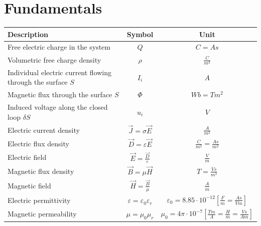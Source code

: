\section{Fundamentals}

\begin{tabular}{|l|c|c|}
\hline \textbf{Description} & \textbf{Symbol} & \textbf{Unit} \\ 
\hline Free electric charge in the system & $Q$ & $C = As$ \\
\hline Volumetric free charge density & $\rho$ & $\frac{C}{m^3}$ \\
\hline Individual electric current flowing through the surface $S$ & $I_i$ & $A$ \\
\hline Magnetic flux through the surface $S$ & $\Phi$	& $Wb = Tm^2$\\
\hline Induced voltage along the closed loop $\delta S$ & $u_i$ & $V$ \\
\hline Electric current density & $\vec{J} = \sigma \vec{E}$ & $\frac{A}{m^2}$\\
\hline Electric flux density & $\vec{D} = \varepsilon \vec{E}$ & $\frac{C}{m^2} = \frac{As}{m^2}$\\
\hline Electric field & $\vec{E} = \frac{\vec{D}}{\varepsilon}$ & $\frac{V}{m}$\\
\hline Magnetic flux density & $\vec{B} = \mu \vec{H}$ & $T = \frac{Vs}{m^2}$\\
\hline Magnetic field & $\vec{H} = \frac{\vec{B}}{\mu}$ & $\frac{A}{m}$\\
\hline Electric permittivity & $\varepsilon = \varepsilon_0 \varepsilon_r$ & $\varepsilon_0 = 8.85 \cdot 10^{-12} \left[\frac{F}{m} = \frac{As}{Vm}\right]$\\
\hline Magnetic permeability & $\mu = \mu_0 \mu_r$ & $\mu_0 = 4\pi \cdot 10^{-7} \left[\frac{Tm}{A} = \frac{H}{m} = \frac{Vs}{Am}\right]$ \\
\hline 
\end{tabular} 

